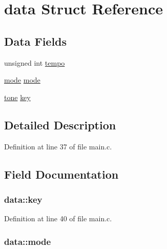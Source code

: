 \hypertarget{structdata}{\section{data Struct Reference}
\label{structdata}
}
\subsection*{Data Fields}
\begin{DoxyCompactItemize}
\item 
unsigned int \hyperlink{structdata_a31232da79683035a6ff185f530da6c24}{tempo}
\item 
\hyperlink{main_8c_a1a6b6fb557d8d37d59700faf4e4c9167}{mode} \hyperlink{structdata_a9781fc7b786289e4c06b4085d31558e3}{mode}
\item 
\hyperlink{main_8c_aeb761eda34d47c3e64ca804875fd919f}{tone} \hyperlink{structdata_ae1a174f61aada93146a06764a3511eb6}{key}
\end{DoxyCompactItemize}


\subsection{Detailed Description}


Definition at line 37 of file main.\+c.



\subsection{Field Documentation}
\hypertarget{structdata_ae1a174f61aada93146a06764a3511eb6}{
\subsubsection[{key}]{ data\+::key}}\label{structdata_ae1a174f61aada93146a06764a3511eb6}


Definition at line 40 of file main.\+c.

\hypertarget{structdata_a9781fc7b786289e4c06b4085d31558e3}{
\subsubsection[{mode}]{ data\+::mode}}\label{structdata_a9781fc7b786289e4c06b4085d31558e3}


